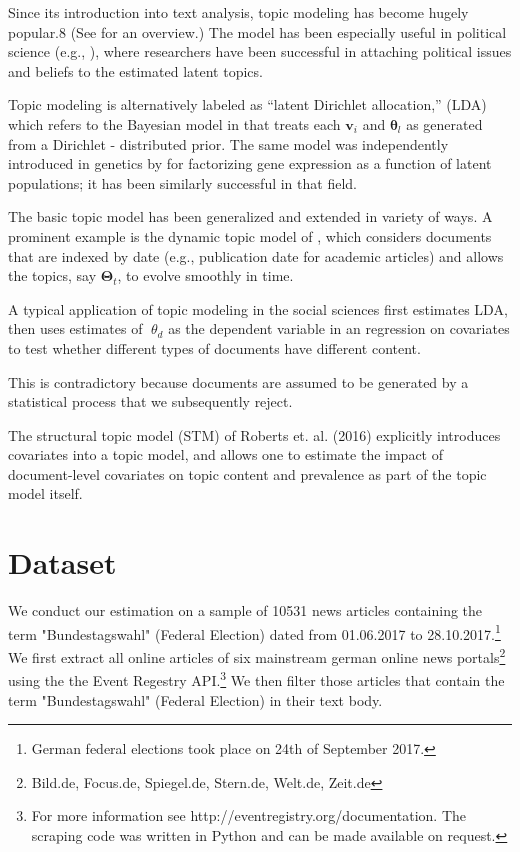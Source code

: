 \documentclass[12pt,a4paper,notitlepage]{article}
\begin{document}
Since its introduction into text analysis, topic modeling has become hugely popular.8 (See \citet{blei_probabilistic_2012} for an overview.) The model has been especially useful in political science (e.g., \citep{grimmer_bayesian_2010}), where researchers have been successful in attaching political issues and beliefs to the estimated latent topics.

Topic modeling is alternatively labeled as “latent Dirichlet allocation,” (LDA) which refers to the Bayesian model in \citet{blei_latent_2003} that treats each $\boldsymbol{v}_i$ and $\boldsymbol{\theta}_l$ as generated from a Dirichlet - distributed prior.
The same model was independently introduced in genetics by \citet{pritchard_inference_2000} for factorizing gene expression as a function of latent populations; it has been similarly successful in that field. 

The basic topic model has been generalized and extended in variety of ways. A prominent example is the dynamic topic model of \citet{blei_dynamic_2006}, which considers documents that are indexed by date (e.g., publication date for academic articles) and allows the topics, say $\boldsymbol{\Theta}_t$, to evolve smoothly in time. 

A typical application of topic modeling in the social sciences first estimates LDA, then uses estimates of $\theta_d$ as the dependent variable in an regression on covariates to test whether different types of documents have different content. 

This is contradictory because documents are assumed to be generated by a statistical process that we subsequently reject.

The structural topic model (STM) of Roberts et. al. (2016) explicitly introduces covariates into a topic model, and allows one to estimate the impact of document-level covariates on topic content and prevalence as part of the topic model itself.


\section{Dataset}\label{ch_data}

We conduct our estimation on a sample of 10531 news articles containing the term "Bundestagswahl" (Federal Election) dated from 01.06.2017 to 28.10.2017.\footnote{German federal elections took place on 24th of September 2017.} We first extract all online articles of six mainstream german online news portals\footnote{Bild.de, Focus.de, Spiegel.de, Stern.de, Welt.de, Zeit.de} using the the Event Regestry API.\footnote{For more information see http://eventregistry.org/documentation. The scraping code was written in Python and can be made available on request.} We then filter those articles that contain the term "Bundestagswahl" (Federal Election) in their text body. 
\end{document}
